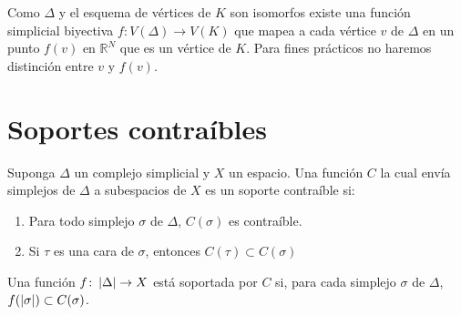 Como $\Delta$ y el esquema de vértices de $K$ son isomorfos existe una función simplicial biyectiva $f\colon V(\Delta)\rightarrow V(K)$ que mapea a cada vértice $v$ de $\Delta$ en un punto $f(v)$ en $\mathbb{R}^N$ que es un vértice de $K$. Para fines prácticos no haremos distinción entre $v$ y $f(v)$.

\section{Soportes contraíbles}
\begin{Defi}
Suponga $\Delta$ un complejo simplicial y $X$ un espacio. Una función $C$ la cual envía simplejos de $\Delta$ a subespacios de $X$ es un soporte contraíble si:
\begin{enumerate}
\item Para todo simplejo $\sigma$ de $\Delta$, $C(\sigma)$ es contraíble.
\item Si $\tau$ es una cara de $\sigma$, entonces $C(\tau)\subset C(\sigma)$
\end{enumerate}
\end{Defi}
\begin{Defi}
Una función $f\colon \left| \Delta \right| \rightarrow X$ está soportada por $C$ si, para cada simplejo $\sigma$ de $\Delta$, $f(\left| \sigma \right|)\subset C(\sigma)$.
\end{Defi}

